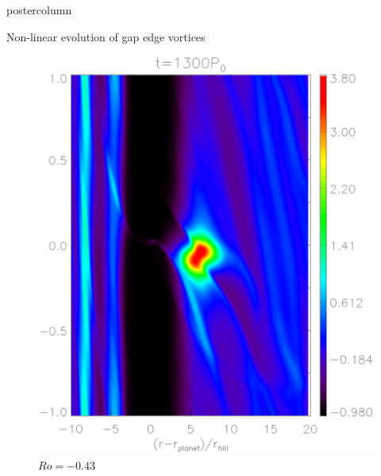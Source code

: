 \documentclass[final,hyperref={pdfpagelabels=false}]{beamer}
\begin{document}
\begin{frame}
\begin{columns}
\begin{column}{.49\textwidth}
\begin{beamercolorbox}[center,wd=\textwidth]{postercolumn}
\begin{minipage}[T]{.95\textwidth}
{\begin{block}{\Large{Non-linear evolution of gap edge
                  vortices}}
\begin{figure}
\begin{minipage}{0.3\textwidth}
                      \caption{$Ro=-0.15$}
                    \end{minipage}
                    \hfill
                    \begin{minipage}{0.3\textwidth}
                      \includegraphics[width=\textwidth]{Posterfig_During}
                      \caption{$Ro=-0.43$}
                    \end{minipage}
                    \hfill
                    \begin{minipage}{0.3\textwidth}

\end{minipage}
\end{figure}
\end{block}}
\end{minipage}
\end{beamercolorbox}
\end{column}
\end{columns}
\end{frame}
\end{document}

